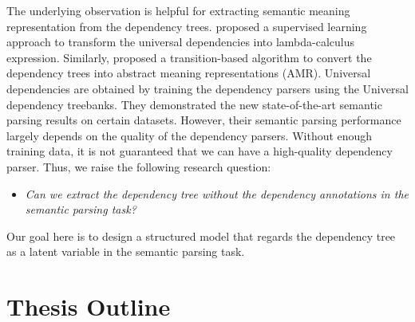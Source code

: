 The underlying observation is helpful for extracting semantic meaning representation from the dependency trees. 
\citet{reddy2016transforming,reddy2017universal} proposed a supervised learning approach to transform the universal dependencies into lambda-calculus expression. 
Similarly, \citet{wang2015transition} proposed a transition-based algorithm to convert the dependency trees into abstract meaning representations (AMR).
Universal dependencies are obtained by training the dependency parsers using the Universal dependency treebanks.
They demonstrated the new state-of-the-art semantic parsing results on certain datasets. 
However, their semantic parsing performance largely depends on the quality of the dependency parsers. 
Without enough training data, it is not guaranteed that we can have a high-quality dependency parser. 
Thus, we raise the following research question:
\begin{itemize}
	\item \textit{Can we extract the dependency tree without the dependency annotations in the semantic parsing task?}
\end{itemize}
Our goal here is to design a structured model that regards the dependency tree as a latent variable in the semantic parsing task. 


\section{Thesis Outline}



